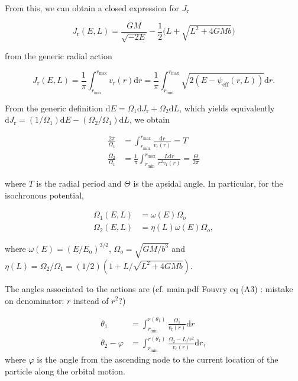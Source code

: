 \documentclass[11pt]{article}
\newcommand{\rr}{\mathrm{r}}
\newcommand{\ro}{\mathrm{o}}
\newcommand{\Eo}{E_{\ro}}
\newcommand{\vr}{v_{\rr}}
\newcommand{\rd}{{\mathrm{d}}}
\newcommand{\rmax}{r_{\max}}
\newcommand{\rmin}{r_{\min}}
\newcommand{\psieff}{\psi_{\mathrm{eff}}}
\newcommand{\Jr}{J_{\mathrm{r}}}
\begin{document}
From this, we can obtain a closed expression for $\Jr$

\begin{equation}
  \Jr (E,L)= \frac{GM}{\sqrt{-2E}} - \frac{1}{2} \bigg(L+\sqrt{L^{2}+4GMb}\bigg)
  \label{eq:Jr_Iso}
\end{equation}

from the generic radial action

\begin{equation}
  \Jr (E,L)= \frac{1}{\pi} \int_{\rmin}^{\rmax} \vr(r) \rd r =  \frac{1}{\pi} \int_{\rmin}^{\rmax} \sqrt{2(E-\psieff(r,L))} \rd r .
  \label{eq:Jr_Generic}
\end{equation}

From the generic definition $\rd E = \Omega_{1} \rd \Jr + \Omega_{2} \rd L$, which yields equivalently $\rd \Jr = (1/\Omega_{1}) \rd E - (\Omega_{2}/\Omega_{1}) \rd L$, we obtain

\begin{align*}
  \frac{2\pi}{\Omega_{1}} &= \int_{\rmin}^{\rmax} \frac{\rd r}{\vr(r)} = T \\
  \frac{\Omega_{2}}{\Omega_{1}} &= \frac{1}{\pi} \int_{\rmin}^{\rmax} \frac{L \rd r}{r^{2} \vr(r)} = \frac{\Theta}{2\pi}
\end{align*}

where $T$ is the radial period and $\Theta$ is the apsidal angle. In particular, for the isochronous potential,

\begin{align*}
  \Omega_{1} (E,L)&= \omega(E) \Omega_{o} \\
  \Omega_{2} (E,L)&= \eta(L) \omega(E) \Omega_{o} ,
\end{align*}

where $\omega(E) = (E/\Eo)^{3/2}$, $\Omega_{o}=\sqrt{GM/b^{3}}$ and $\eta(L)=\Omega_{2}/\Omega_{1}=(1/2)(1+L/\sqrt{L^{2}+4GMb})$.

The angles associated to the actions are (cf. main.pdf Fouvry eq (A3) : mistake on denominator: $r$ instead of $r^{2}$?)

\begin{align*}
  \theta_{1} &= \int_{\rmin}^{r(\theta_{1})} \frac{\Omega_{1}}{\vr(r)} \rd r \\
  \theta_{2} - \varphi &= \int_{\rmin}^{r(\theta_{1})} \frac{\Omega_{2} - L/r^{2}}{\vr(r)} \rd r,
  \end{align*}
where $\varphi$ is the angle from the ascending node to the current location
of the particle along the orbital motion.
\end{document}
